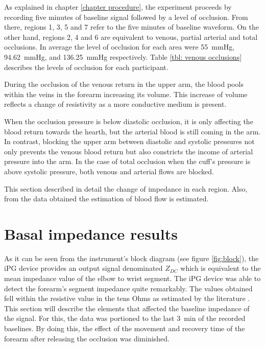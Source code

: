 As explained in chapter \ref{chapter procedure}, the experiment proceeds by recording five minutes of baseline signal followed by a level of occlusion. From there, regions 1, 3, 5 and 7 refer to the five minutes of baseline waveform. On the other hand, regions 2, 4 and 6 are equivalent to venous, partial arterial and total occlusions. In average the level of occlusion for each area were \SI{55}{\mmHg}, \SI{94.62}{\mmHg}, and  \SI{136.25}{\mmHg} respectively. Table  \ref{tbl: venous occlusions} describes the levels of occlusion for each participant. 

During the occlusion of the venous return in the upper arm, the blood pools within the veins in the forearm increasing its volume. This increase of volume reflects a change of resistivity as a more conductive medium is present. 

When the occlusion pressure is below diastolic occlusion, it is only affecting the blood return towards the hearth, but the arterial blood is still coming in the arm. In contrast, blocking the upper arm between diastolic and systolic pressures not only prevents the venous blood return but also constricts the income of arterial pressure into the arm. In the case of total occlusion when the cuff's pressure is above systolic pressure, both venous and arterial flows are blocked. 

This section described in detail the change of impedance in each region. Also, from the data obtained the estimation of blood flow is estimated.


\section{Basal impedance results}
\label{section basal 1}
As it can be seen from the instrument's block diagram (see figure \ref{fig:block}), the iPG device provides an output signal denominated $Z_{DC}$ which is equivalent to the mean impedance value of the elbow to wrist segment. The iPG device was able to detect the forearm's segment impedance quite remarkably. The values obtained fell within the resistive value in the tens Ohms as estimated by the literature \cite{dai2009vivo, faes1999electric, grimnes1983impedance}. This section will describe the elements that affected the baseline impedance of the signal. For this, the data was portioned to the last \SI{3}{\minute} of the recorded baselines. By doing this, the effect of the movement and recovery time of the forearm after releasing the occlusion was diminished. 

